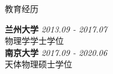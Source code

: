 \documentclass{resume} %
\begin{document}
\begin{rSection}{教育经历}

{\bf 兰州大学} \hfill {\em 2013.09 - 2017.07} \\ 
物理学学士学位 \\

{\bf 南京大学} \hfill {\em 2017.09 - 2020.06} \\ 
天体物理硕士学位







\end{rSection}
\end{document}
